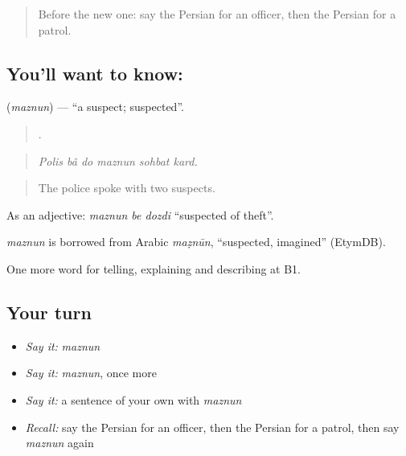 \label{lesson:FA-C319-maznun}



\begin{quote}
Before the new one: say the Persian for an officer, then the Persian for a patrol.
\end{quote}

\subsection*{You'll want to know: }
\textbf{} (\emph{maznun}) — \textquotedblleft{}a suspect; suspected\textquotedblright{}.

\begin{quote}
     .
\end{quote}

\begin{quote}
\emph{Polis bâ do maznun sohbat kard.}
\end{quote}

\begin{quote}
The police spoke with two suspects.
\end{quote}

As an adjective: \emph{maznun be dozdi} \textquotedblleft{}suspected of theft\textquotedblright{}.

\begin{cousinweb}
\emph{maznun} is borrowed from Arabic \emph{maẓnūn}, \textquotedblleft{}suspected, imagined\textquotedblright{} (EtymDB).
\end{cousinweb}

\begin{grammarlens}[title={What you've built}]
One more word for telling, explaining and describing at B1.
\end{grammarlens}

\subsection*{Your turn}
\begin{itemize}
\raggedright
  \item \emph{Say it:} \emph{maznun}
  \item \emph{Say it:} \emph{maznun}, once more
  \item \emph{Say it:} a sentence of your own with \emph{maznun}
  \item \emph{Recall:} say the Persian for an officer, then the Persian for a patrol, then say \emph{maznun} again
\end{itemize}

